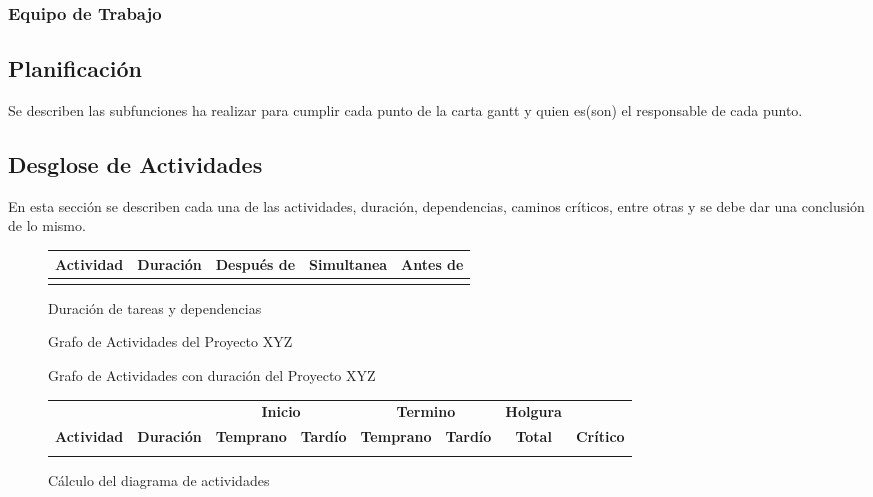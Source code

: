 \documentclass[letter,12pt]{report}
\begin{document}
\subsubsection{Equipo de Trabajo}

\subsection{Planificación}
Se describen las subfunciones ha realizar para cumplir cada punto de la carta gantt y quien es(son) el responsable de cada punto.

\subsection{Desglose de Actividades}\label{PERT}
En esta sección se describen cada una de las actividades, duración, dependencias, caminos críticos, entre otras y se debe dar una conclusión de lo mismo.
\begin{figure}[hbt]
\begin{tabular}{|c|c|c|c|c|}\hline
  \textbf{Actividad}&\textbf{Duración} &\textbf{Después de} & \textbf{Simultanea} & \textbf{Antes de}\\\hline
& & &&\\\hline

\end{tabular}
  \caption{Duración de tareas y dependencias}
\end{figure}

\begin{landscape}
\begin{figure}[hbt]
  \centering
  \caption{Grafo de Actividades del Proyecto XYZ}
  \label{CPM}
\end{figure}
\end{landscape}

\begin{landscape}
\begin{figure}[hbt]
  \centering
  \caption{Grafo de Actividades con duración del Proyecto XYZ}
  \label{CPMduracion}
\end{figure}
\end{landscape}

\begin{figure}[hbt]
 \begin{tabular}{|c|c|cc|cc|c|c|}\hline
 & & \multicolumn{2}{|c|}{\textbf{Inicio}} & \multicolumn{2}{|c|}{\textbf{Termino}} & \textbf{Holgura} & \\
\textbf{Actividad}& \textbf{Duración}& \textbf{Temprano} &\textbf{Tardío} &\textbf{Temprano} &\textbf{Tardío} &\textbf{Total}  &\textbf{Crítico} \\\hline
& & &   & &   & & \\\hline

\end{tabular}
  \caption{Cálculo del diagrama de actividades}
\end{figure}
\end{document}
